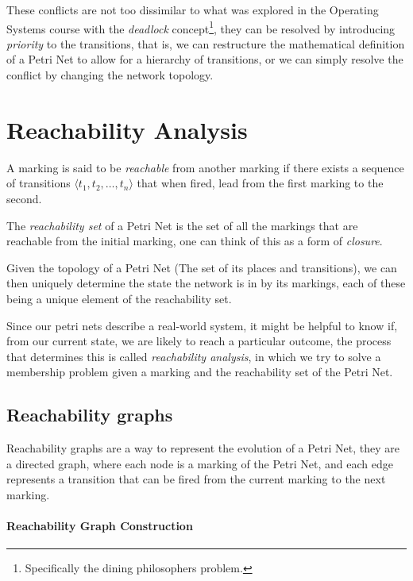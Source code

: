 \documentclass[openright, twoside, twocolumn, a4paper, 10pt]{report}
\begin{document}
These conflicts are not too dissimilar to what was explored in the
Operating Systems course with the \emph{deadlock} concept\footnote{
	Specifically the dining philosophers problem.
}, they can be resolved by introducing \emph{priority} to the transitions, that is, we can
restructure the mathematical definition of a Petri Net to allow for a hierarchy of transitions, or we can simply resolve the conflict by changing the network topology.

\section{Reachability Analysis}

A marking is said to be \emph{reachable} from another marking if there exists a sequence
of transitions $\langle t_1, t_2, \ldots, t_n \rangle$ that when fired, lead from the first marking to the second.

\begin{definition}
	The \emph{reachability set} of a Petri Net is the set of all the markings that are reachable from the initial marking, one can think of this as a form of \emph{closure}.
\end{definition}

Given the topology of a Petri Net (The set of its places and transitions), we can then
uniquely determine the state the network is in by its markings, each of these being a
unique element of the reachability set.

Since our petri nets describe a real-world system, it might be helpful to know if,
from our current state, we are likely to reach a particular outcome, the process that
determines this is called \emph{reachability analysis}, in which we
try to solve a membership problem given a marking and the reachability set of the Petri Net.

\subsection{Reachability graphs}

Reachability graphs are a way to represent the evolution of a Petri Net, they are a directed graph, where
each node is a marking of the Petri Net, and each edge represents a transition that can be fired from the
current marking to the next marking.

\paragraph{Reachability Graph Construction}
\end{document}
